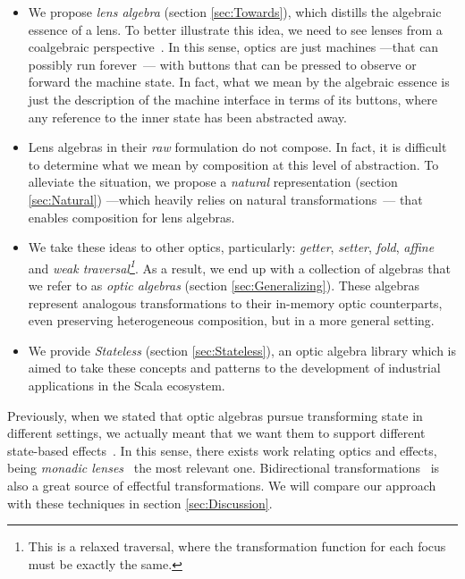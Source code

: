 \documentclass[final, twocolumn, 3p]{elsarticle}
\begin{document}
\begin{itemize}

\item We propose \emph{lens algebra} (section \ref{sec:Towards}), which distills
the algebraic essence of a lens. To better illustrate this idea, we need to see
lenses from a coalgebraic perspective~\cite{jacobs1995objects,
jacobs1997tutorial, oconnor2011functor}. In this sense, optics are just machines
---that can possibly run forever~\cite{turner2004total}--- with buttons that can
be pressed to observe or forward the machine state. In fact, what we mean by the
algebraic essence is just the description of the machine interface in terms of
its buttons, where any reference to the inner state has been abstracted away.

\item Lens algebras in their \emph{raw} formulation do not compose. In fact, it
is difficult to determine what we mean by composition at this level of
abstraction. To alleviate the situation, we propose a \emph{natural}
representation (section \ref{sec:Natural}) ---which heavily relies on natural
transformations~\cite{pierce1991basic}--- that enables composition for lens
algebras.

\item We take these ideas to other optics, particularly: \emph{getter},
\emph{setter}, \emph{fold}, \emph{affine} and \emph{weak traversal\footnote{This
is a relaxed traversal, where the transformation function for each focus must be
exactly the same.}}. As a result, we end up with a collection of algebras that
we refer to as \emph{optic algebras} (section \ref{sec:Generalizing}). These
algebras represent analogous transformations to their in-memory optic
counterparts, even preserving heterogeneous composition, but in a more general
setting.

\item We provide \emph{Stateless} (section \ref{sec:Stateless}), an optic
algebra library which is aimed to take these concepts and patterns to the
development of industrial applications in the Scala ecosystem.

\end{itemize}

Previously, when we stated that optic algebras pursue transforming state in
different settings, we actually meant that we want them to support different
state-based effects~\cite{wadler1995monads}. In this sense, there exists work
relating optics and effects, being \emph{monadic
lenses}~\cite{abou2016reflections} the most relevant one. Bidirectional
transformations~\cite{abou2015notions, abou2017coalgebraic} is also a great
source of effectful transformations. We will compare our approach with these
techniques in section \ref{sec:Discussion}.
\end{document}
